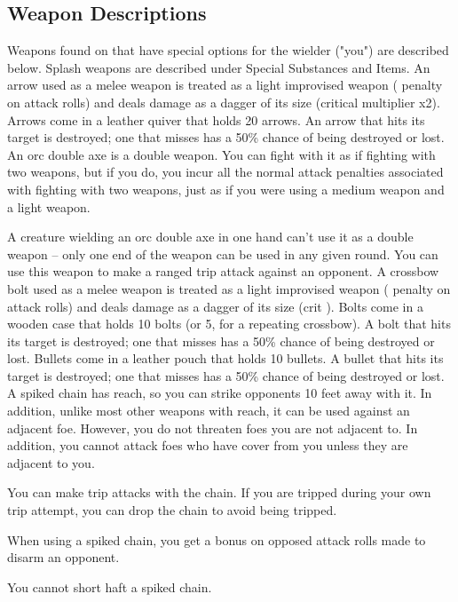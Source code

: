 \subsection{Weapon Descriptions}
Weapons found on  that have special options for the wielder ("you") are described below. Splash weapons are described under Special Substances and Items.
 An arrow used as a melee weapon is treated as a light improvised weapon ( penalty on attack rolls) and deals damage as a dagger of its size (critical multiplier x2). Arrows come in a leather quiver that holds 20 arrows. An arrow that hits its target is destroyed; one that misses has a 50\% chance of being destroyed or lost.
 An orc double axe is a double weapon. You can fight with it as if fighting with two weapons, but if you do, you incur all the normal attack penalties associated with fighting with two weapons, just as if you were using a medium weapon and a light weapon.
\par A creature wielding an orc double axe in one hand can't use it as a double weapon -- only one end of the weapon can be used in any given round.
 You can use this weapon to make a ranged trip attack against an opponent.
 A crossbow bolt used as a melee weapon is treated as a light improvised weapon ( penalty on attack rolls) and deals damage as a dagger of its size (crit ). Bolts come in a wooden case that holds 10 bolts (or 5, for a repeating crossbow). A bolt that hits its target is destroyed; one that misses has a 50\% chance of being destroyed or lost.
 Bullets come in a leather pouch that holds 10 bullets. A bullet that hits its target is destroyed; one that misses has a 50\% chance of being destroyed or lost.
 A spiked chain has reach, so you can strike opponents 10 feet away with it. In addition, unlike most other weapons with reach, it can be used against an adjacent foe. However, you do not threaten foes you are not adjacent to. In addition, you cannot attack foes who have cover from you unless they are adjacent to you.
\par You can make trip attacks with the chain. If you are tripped during your own trip attempt, you can drop the chain to avoid being tripped.
\par When using a spiked chain, you get a  bonus on opposed attack rolls made to disarm an opponent.
\par You cannot short haft a spiked chain.

